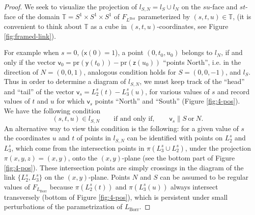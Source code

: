 \documentclass[12pt]{article}
\begin{document}
\begin{proof}
  We seek to visualize the projection of $l_{S,N}=l_S\cup l_N$ on the $su$-face and $st$-face of the domain $\mathbb{T}=S^1\times
S^1\times S^1$ of $F_{L^\text{Bor}}$ parameterized by $(s,t,u)\in \mathbb{T}$, (it is convenient to  think about $\mathbb{T}$ as a cube in $(s,t,u)$-coordinates, see Figure \ref{fig:framed-link}). 

For example when $s=0$, ($\mathsf{x}(0)=1$), a point
$(0,t_0,u_0)$ belongs to $l_N$, if and only if the vector $\mathsf{v}_0=\text{pr}(\mathsf{y}(t_0))-\text{pr}(\mathsf{z}(u_0))$
``points North'', i.e. in the direction of $N=(0,0,1)$, analogous condition holds for 
$S=(0,0,-1)$, and $l_S$. Thus in order to determine a diagram of $l_{S,N}$, we must keep track of the ``head'' and ``tail'' of the vector $\mathsf{v}_s=L^s_2(t)-L^s_3(u)$, for various values of $s$ and record values of $t$ and $u$
for which $\mathsf{v}_s$ points ``North'' and ``South''
(Figure \ref{fig:4-pos}). We have the following condition
\begin{equation}\label{eq:arrow-eq}
  (s,t,u)\in l_{S,N}\qquad\text{if and only if},\qquad \mathsf{v}_s \parallel S\ \text{or}\ N.
\end{equation}
 An alternative way to view this condition is the following: for a given value of $s$ 
the coordinates $u$ and $t$ of points in $l_{S,N}$ can be identified with points on $L^s_2$
and $L^s_3$, which come from the intersection points in $\pi(L^s_3\cup L^s_2)$, under the projection $\pi(x,y,z)=(x,y)$, onto the $(x,y)$-plane (see the bottom part of Figure \ref{fig:4-pos}). These intersection points are simply crossings in the diagram of the link 
$\{L^s_2,L^s_3\}$ on the $(x,y)$-plane. Points $N$ and $S$ can be assumed to be regular values of $F_{L_\text{Borr}}$ because $\pi(L^s_2(t))$ and $\pi(L^s_3(u))$ always intersect transversely (bottom of Figure \ref{fig:4-pos}), which is persistent under small perturbations of the parametrization of $L_\text{Borr}$.


\end{proof}
\end{document}
